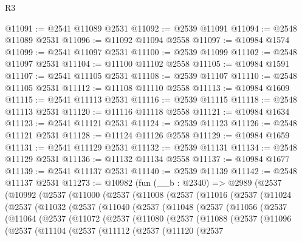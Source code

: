 \begin{lexlean}{R3}
\begin{coremodule}
@11091 := @2541 @11089 @2531
@11092 := @2539 @11091
@11094 := @2548 @11089 @2531
@11096 := @11092 @11094 @2558
@11097 := @10984 @1574
@11099 := @2541 @11097 @2531
@11100 := @2539 @11099
@11102 := @2548 @11097 @2531
@11104 := @11100 @11102 @2558
@11105 := @10984 @1591
@11107 := @2541 @11105 @2531
@11108 := @2539 @11107
@11110 := @2548 @11105 @2531
@11112 := @11108 @11110 @2558
@11113 := @10984 @1609
@11115 := @2541 @11113 @2531
@11116 := @2539 @11115
@11118 := @2548 @11113 @2531
@11120 := @11116 @11118 @2558
@11121 := @10984 @1634
@11123 := @2541 @11121 @2531
@11124 := @2539 @11123
@11126 := @2548 @11121 @2531
@11128 := @11124 @11126 @2558
@11129 := @10984 @1659
@11131 := @2541 @11129 @2531
@11132 := @2539 @11131
@11134 := @2548 @11129 @2531
@11136 := @11132 @11134 @2558
@11137 := @10984 @1677
@11139 := @2541 @11137 @2531
@11140 := @2539 @11139
@11142 := @2548 @11137 @2531
@11273 := @10982
    (fun (__b : @2340) =>
    @2989
      (@2537
        (@10992
          (@2537
            (@11000
              (@2537
                (@11008
                  (@2537
                    (@11016
                      (@2537
                        (@11024
                          (@2537
                            (@11032
                              (@2537
                                (@11040
                                  (@2537
                                    (@11048
                                      (@2537
                                        (@11056
                                          (@2537
                                            (@11064
                                              (@2537
                                                (@11072
                                                  (@2537
                                                    (@11080
                                                      (@2537
                                                        (@11088
                                                          (@2537
                                                            (@11096
                                                              (@2537
                                                                (@11104
                                                                  (@2537
                                                                    (@11112
                                                                      (@2537
                                                                        (@11120
                                                                          (@2537

\end{coremodule}
\end{lexlean}
